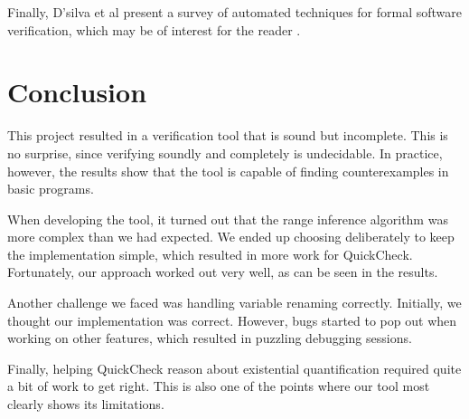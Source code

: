 \documentclass[a4paper]{article}
\begin{document}
Finally, D'silva et al present a survey of automated techniques for formal software
verification, which may be of interest for the reader \cite{d2008survey}.

\section{Conclusion}

This project resulted in a verification tool that is sound but incomplete.
This is no surprise, since verifying soundly and completely is undecidable.
In practice, however, the results show that the tool is capable of finding
counterexamples in basic programs.

When developing the tool, it turned out that the range inference algorithm
was more complex than we had expected. We ended up choosing deliberately to
keep the implementation simple, which resulted in more work for QuickCheck.
Fortunately, our approach worked out very well, as can be seen in the results.

Another challenge we faced was handling variable renaming correctly. Initially,
we thought our implementation was correct. However, bugs started to pop out when
working on other features, which resulted in puzzling debugging sessions.

Finally, helping QuickCheck reason about existential quantification required
quite a bit of work to get right. This is also one of the points where our tool
most clearly shows its limitations.



\end{document}
